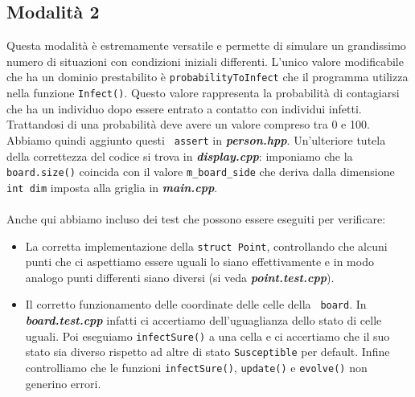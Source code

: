 \documentclass[a4paper,10 pt]{article}
\begin{document}
\subsection{Modalità 2}
Questa modalità è estremamente versatile e permette di simulare un grandissimo numero di situazioni con condizioni iniziali differenti. L'unico valore modificabile che ha un dominio prestabilito è \verb!probabilityToInfect! che il programma utilizza nella funzione \verb!Infect()!. Questo valore rappresenta la probabilità di contagiarsi che ha un individuo dopo essere entrato a contatto con individui infetti. Trattandosi di una probabilità deve avere un valore compreso tra 0 e 100. Abbiamo quindi aggiunto questi \verb! assert! in \textbf{\textit{person.hpp}}. Un'ulteriore tutela della correttezza del codice si trova in \textbf{\textit{display.cpp}}: imponiamo che la \verb!board.size()! coincida con il valore \verb!m_board_side! che deriva dalla dimensione \verb!int dim! imposta alla griglia in \textbf{\textit{main.cpp}}.
\ \\
\ \\
Anche qui abbiamo incluso dei test che possono essere eseguiti per verificare:
\begin{itemize}
\item La corretta implementazione della \verb!struct Point!, controllando che alcuni punti che ci aspettiamo essere uguali lo siano effettivamente e in modo analogo punti differenti siano diversi (si veda  \textbf{\textit{point.test.cpp}}).
\item Il corretto funzionamento delle coordinate delle celle della \verb! board!. In \textbf{\textit{board.test.cpp}} infatti ci accertiamo dell'uguaglianza dello stato di celle uguali. Poi eseguiamo \verb!infectSure()! a una cella e ci accertiamo che il suo stato sia diverso rispetto ad altre di stato \verb!Susceptible! per default. Infine controlliamo che le funzioni \verb!infectSure()!, \verb!update()! e \verb!evolve()! non generino errori.
 \end{itemize}
\end{document}
